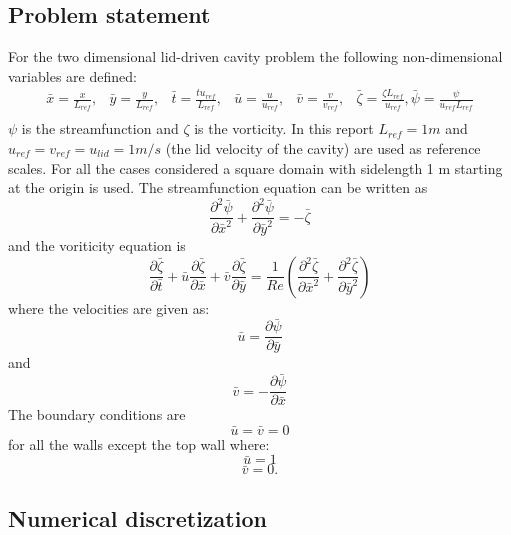 \subsection{Problem statement}
For the two dimensional lid-driven cavity problem the following non-dimensional variables are defined:
%
\begin{align*}
\bar{x} = \frac{x}{L_{ref}}, & \bar{y} = \frac{y}{L_{ref}}, & \bar{t}= \frac{t u_{ref}}{L_{ref}} , & \bar{u}=\frac{u}{u_{ref}} , & \bar{v}=\frac{v}{v_{ref}},& \bar{\zeta} = \frac{\zeta L_{ref}}{u_{ref}}, \bar{\psi} = \frac{\psi}{u_{ref} L_{ref}} \\
\end{align*}
$\psi$ is the streamfunction and $\zeta$ is the vorticity. In this report $L_{ref} = 1m$ and $u_{ref}=v_{ref}=u_{lid}=1 m/s$ (the lid velocity of the cavity) are used as reference scales. For all the cases considered a square domain with sidelength 1 m starting at the origin is used. The streamfunction equation can be written as
\begin{equation}
\frac{\partial^2 \bar{\psi}}{\partial \bar{x}^2} + \frac{\partial^2 \bar{\psi}}{\partial \bar{y}^2}=-\bar{\zeta}
\label{eq:sf}
\end{equation}
and the voriticity equation is
\begin{equation}
\frac{\partial \bar{\zeta}}{\partial \bar{t}} + \bar{u} \frac{\partial \bar{\zeta}}{\partial \bar{x}} + \bar{v} \frac{\partial \bar{\zeta}}{\partial \bar{y}} = \frac{1}{Re} \left( \frac{\partial^2 \bar{\zeta}}{\partial \bar{x}^2} + \frac{\partial^2 \bar{\zeta}}{\partial \bar{y}^2} \right)
\end{equation}
where the velocities are given as:
\begin{equation}
\bar{u} = \frac{\partial \bar{\psi}}{\partial \bar{y}}
\end{equation}
and  
\begin{equation}
\bar{v} = -\frac{\partial \bar{\psi}}{\partial \bar{x}}
\end{equation}
The boundary conditions are 
\begin{equation}
\bar{u} = \bar{v} = 0
\end{equation}
for all the walls except the top wall where:
\begin{equation}
\bar{u} = 1 
\end{equation}
\begin{equation}
\bar{v} = 0.
\end{equation}
%
\subsection{Numerical discretization}
